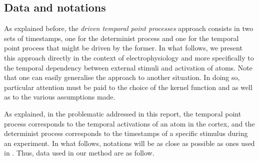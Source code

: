 \subsection{Data and notations}

As explained before, the \textit{driven temporal point processes} approach consists in two sets of timestamps, one for the determinist process and one for the temporal point process that might be driven by the former.
In what follows, we present this approach directly in the context of electrophysiology and more specifically to the temporal dependency between external stimuli and activation of atoms. 
Note that one can easily generalise the approach to another situation.
In doing so, particular attention must be paid to the choice of the kernel function and as well as to the various assumptions made.

As explained, in the problematic addressed in this report, the temporal point process corresponds to the temporal activations of an atom in the cortex, and the determinist process corresponds to the timestamps of a specific stimulus during an experiment.
In what follows, notations will be as close as possible as ones used in \citep{jas2017learning, dupre2018multivariate, moreau2019distributed}.
Thus, data used in our method are as follow.

